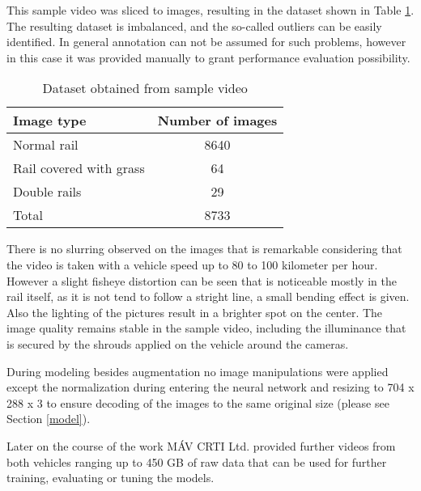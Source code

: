 This sample video was sliced to images, resulting in the dataset shown in Table \ref{table:dataset}.
The resulting dataset is imbalanced, and the so-called outliers can be easily identified.
In general annotation can not be assumed for such problems, however in this case it was
provided manually to grant performance evaluation possibility.

\begin{table}[!ht]
    \centering
    \begin{tabular}{l c}
        Image type              & Number of images \\
        \hline
        Normal rail             & 8640             \\
        Rail covered with grass & 64               \\
        Double rails            & 29               \\
        \hline
        Total                   & 8733             \\
    \end{tabular}
    \caption{Dataset obtained from sample video}
    \label{table:dataset}
\end{table}

There is no slurring observed on the images that is remarkable considering that the video is taken
with a vehicle speed up to 80 to 100 kilometer per hour.
However a slight fisheye distortion can be seen that is noticeable mostly in the rail itself,
as it is not tend to follow a stright line, a small bending effect is given.
Also the lighting of the pictures result in a brighter spot on the center.
The image quality remains stable in the sample video, including the illuminance that is
secured by the shrouds applied on the vehicle around the cameras.

During modeling besides augmentation no image manipulations were applied
except the normalization during entering the neural network
and resizing to 704 x 288 x 3 to ensure decoding of the images to the same original size
(please see Section \ref{model}).

Later on the course of the work MÁV CRTI Ltd. provided further videos from both vehicles
ranging up to 450 GB of raw data that can be used for further training, evaluating or tuning
the models.